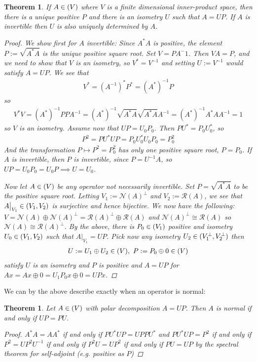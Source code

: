 \documentclass[10pt,twoside,openany,final]{memoir}
\theoremstyle{break}
\newtheorem{theorem}[section]{Theorem}
\theoremstyle{Break}
\let\Hom\relax
\DeclareMathOperator{\Hom}{Hom}
\let\End\relax
\DeclareMathOperator{\End}{End}
\newcommand{\Rg}{\mathcal{R}}
\newcommand{\Nl}{\mathcal{N}}
\begin{document}
\begin{theorem}
	If $A \in \End(V)$ where $V$ is a finite dimensional inner-product space, then there is a unique positive $P$ and there is an isometry $U$ such that $A=UP$. If $A$ is invertible then $U$ is also uniquely determined by $A$.
	\begin{proof}
		We show first for $A$ invertible: Since $A^*A$ is positive, the element $P:=\sqrt{A^*A}$ is the unique positive square root. Set $V=PA^-1$. Then $VA=P$, and we need to show that $V$ is an isometry, so $V^*=V^{-1}$ and setting $U:=V^{-1}$ would satisfy $A=UP$. We see that
		\begin{align*}
			V^*=(A^{-1})^*P^*=(A^*)^{-1}P
		\end{align*}
		so
		\begin{align*}
			V^*V=(A^*)^{-1}P PA^{-1}=\left( A^* \right)^{-1}\sqrt{A^*A}\sqrt{A^*A}A^{-1}=\left( A^* \right)^{-1}A^*AA^{-1}=1
		\end{align*}
		so $V$ is an isometry. Assume now that $UP=U_0P_0$. Then $PU^*=P_0U_0^*$, so
		\begin{align*}
			P^2=PU^*UP=P_0U_0^*U_0P_0=P_0^2
		\end{align*}
		And the transformation $P \mapsto P^2=P_0^2$ has only one positive square root, $P=P_0$. If $A$ is invertible, then $P$ is invertible, since $P=U^{-1}A$, so $UP=U_0P_0=U_0P\implies U=U_0$.

		Now let $A\in \End(V)$ be any operator not necessarily invertible. Set $P=\sqrt{A^*A}$ to be the positive square root. Letting $V_1:=\Nl(A)^\perp$ and $V_2 := \Rg(A)$, we see that $A\big|_{V_1} \in \Hom(V_1,V_2)$ is surjective and hence bijective. We now have the following: $V=\Nl(A) \oplus \Nl(A)^\perp=\Rg(A)^\perp \oplus \Rg(A)$ and $\Nl(A)^\perp \cong \Rg(A)$ so $\Nl(A) \cong \Rg(A)^\perp$. By the above, there is $P_0 \in \End(V_1)$ positive and isometry $U_0 \in \Hom(V_1,V_2)$ such that $A\big|_{V_1}=UP$. Pick now any isometry $U_2 \in \Hom(V_1^\perp,V_2^\perp)$ then
		\begin{align*}
			U:=U_1 \oplus U_2 \in \End(V), \ P:=P_0 \oplus 0 \in \End(V)
		\end{align*}
		satisfy $U$ is an isometry and $P$ is positive and $A=UP$ for $Ax=Ax\oplus 0 = U_1 P_0 x \oplus 0 = UPx$.
	\end{proof}
\end{theorem}
We can by the above describe exactly when an operator is normal:
\begin{theorem}
	Let $A \in \End(V)$ with polar decomposition $A=UP$. Then $A$ is normal if and only if $UP=PU$.
	\begin{proof}
		$A^*A=AA^*$ if and only if $PU^*UP=UPPU^*$ and $PU^*UP=P^2$ if and only if $P^2=UP^2U^{-1}$ if and only if $P^2U=UP^2$ if and only if $PU=UP$ by the spectral theorem for self-adjoint (e.g. positive as $P$)
	\end{proof}
\end{theorem}
\end{document}
